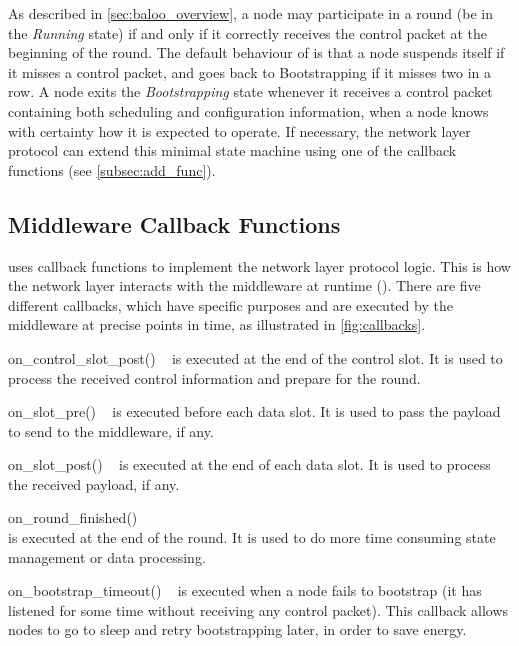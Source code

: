 As described in \cref{sec:baloo_overview}, a node may participate in a round (\ie be in the \textsl{Running} state) if and only if it correctly receives the control packet at the beginning of the round.
%
The default behaviour of \baloo is that a node suspends itself if it misses a control packet, and goes back to Bootstrapping if it misses two in a row. A node exits the \textsl{Bootstrapping} state whenever it receives a control packet containing both scheduling and configuration information, \ie when a node knows with certainty how it is expected to operate.
%
If necessary, the network layer protocol can extend this minimal state machine using one of the callback functions (see \cref{subsec:add_func}).

\subsection{Middleware Callback Functions}
\label{subsec:CB}

\baloo uses callback functions to implement the network layer protocol logic. This is how the network layer interacts with the middleware at runtime ().
%
There are five different callbacks, which have specific purposes and are executed by the middleware at precise points in time, as illustrated in \cref{fig:callbacks}.

\begin{functions}

	\item[on\_control\_slot\_post()]~\newline
	is executed at the end of the control slot.
	It is used to process the received control information and prepare for the round.

	\item[on\_slot\_pre()]~\newline
	is executed before each data slot.
	It is used to pass the payload to send to the middleware, if any.

	\item[on\_slot\_post()]~\newline
	is executed at the end of each data slot.
	It is used to process the received payload, if any.

	\pagebreak
	\item[on\_round\_finished()]~\\
	is executed at the end of the round.
	It is used to do more time consuming state management or data processing.

	\item[on\_bootstrap\_timeout()]~\newline
	is executed when a node fails to bootstrap (\ie it has listened for some time without receiving any control packet).
	This callback allows nodes to go to sleep and retry bootstrapping later, in order to save energy.

\end{functions}

